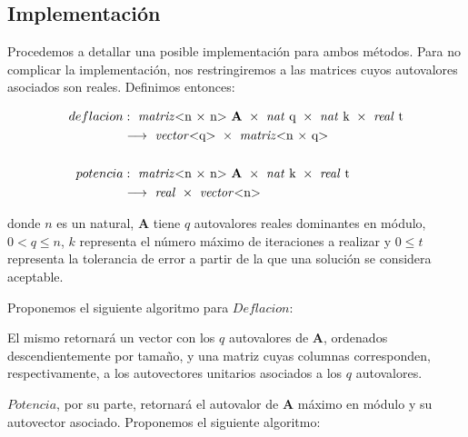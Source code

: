 
\vspace{2em}
\subsection{Implementación} Procedemos a detallar una posible implementación para ambos métodos. Para no complicar la implementación, nos restringiremos a las matrices cuyos autovalores asociados son reales. Definimos entonces:

\begin{align*}
    deflacion&:\ \text{\textit{matriz}$<$n $\times$ n$>$ \textbf{A}}\ \times\ \text{\textit{nat} q}\ \times\ \text{\textit{nat} k}\ \times\ \text{\textit{real} t} \\
    &\longrightarrow\ \text{\textit{vector}$<$q$>$}\ \times\ \text{\textit{matriz}$<$n $\times$ q$>$}
    \\ \\
    potencia&:\ \text{\textit{matriz}$<$n $\times$ n$>$ \textbf{A}}\ \times\ \text{\textit{nat} k}\ \times\ \text{\textit{real} t}\ \\
    & \longrightarrow\ \text{\textit{real}}\ \times\ \text{\textit{vector}$<$n$>$}
\end{align*}

\vspace{1em}
\noindent donde $n$ es un natural, \textbf{A} tiene $q$ autovalores reales dominantes en módulo, $0 < q \leq n$, $k$ representa el número máximo de iteraciones a realizar y $0 \leq t$ representa la tolerancia de error a partir de la que una solución se considera aceptable. 


\vspace{2em}
\noindent Proponemos el siguiente algoritmo para $Deflacion$: 

\vspace{1em}


\vspace{1em}
El mismo retornará un vector con los $q$ autovalores de \textbf{A}, ordenados descendientemente por tamaño, y una matriz cuyas columnas corresponden, respectivamente, a los autovectores unitarios asociados a los $q$ autovalores. 


\vspace{2em}
\noindent $Potencia$, por su parte, retornará el autovalor de \textbf{A} máximo en módulo y su autovector asociado. Proponemos el siguiente algoritmo:

